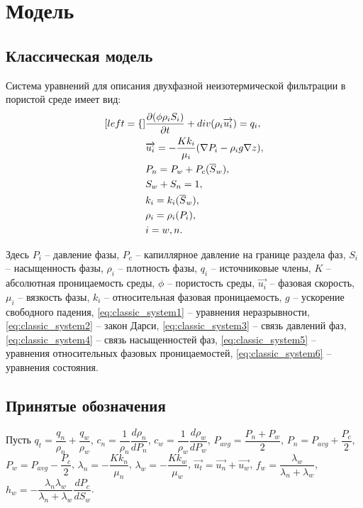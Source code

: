 \section{Модель}
\subsection{Классическая модель}
\label{classic_model}
Система уравнений для описания двухфазной неизотермической фильтрации в пористой среде
имеет вид:
\begin{subequations} \label{eq:classic_system}
  \begin{align}[left = \empheqlbrace\,]
    &\frac{\partial (\phi \rho_i S_i)}{\partial t} + div(\rho_i \overrightarrow{u_i}) = q_i, \label{eq:classic_system1} \\
    &\overrightarrow{u_i} = -\frac{K k_i}{\mu_i}(\nabla P_i - {\rho}_i g \nabla z), \label{eq:classic_system2} \\
    &P_n = P_w + P_{c}(\overline{S}_w), \label{eq:classic_system3} \\
    &S_w + S_n = 1, \label{eq:classic_system4} \\
    &k_i = k_i(\overline{S}_w), \label{eq:classic_system5} \\
    &\rho_i = \rho_i(P_i), \label{eq:classic_system6} \\
    &i = w,n \nonumber .
  \end{align}
\end{subequations}

Здесь 
$P_i$ -- давление фазы,
$P_c$ -- капиллярное давление на границе раздела фаз,
$S_i$ -- насыщенность фазы,
${\rho}_i$ -- плотность фазы,
$q_i$ -- источниковые члены,
$K$ -- абсолютная проницаемость среды,
$\phi$ -- пористость среды,
$\overrightarrow{u_i}$ -- фазовая скорость,
$\mu_i$ -- вязкость фазы,
$k_i$ -- относительная фазовая проницаемость,
$g$ -- ускорение свободного падения,
\eqref{eq:classic_system1} -- уравнения неразрывности,
\eqref{eq:classic_system2} -- закон Дарси,
\eqref{eq:classic_system3} -- связь давлений фаз,
\eqref{eq:classic_system4} -- связь насыщенностей фаз,
\eqref{eq:classic_system5} -- уравнения относительных фазовых проницаемостей,
\eqref{eq:classic_system6} -- уравнения состояния.

\subsection{Принятые обозначения}
\label{syms}
Пусть $q_t = \dfrac{q_n}{\rho_n} + \dfrac{q_w}{\rho_w}$,
$c_n = \dfrac{1}{\rho_n} \dfrac{d\rho_n}{dP_n}$,
$c_w = \dfrac{1}{\rho_w} \dfrac{d\rho_w}{dP_w}$,
$P_{avg} = \dfrac{P_n + P_w}{2}$,
$P_n = P_{avg} + \dfrac{P_c}{2}$,
$P_w = P_{avg} - \dfrac{P_c}{2}$,
$\lambda_n = -\dfrac{K k_n}{\mu_n}$,
$\lambda_w = -\dfrac{K k_w}{\mu_w}$,
$\overrightarrow{u_t} = \overrightarrow{u_n} + \overrightarrow{u_w}$,
$f_w = \dfrac{\lambda_w}{\lambda_n + \lambda_w}$,
$h_w = - \dfrac{\lambda_n\lambda_w}{\lambda_n + \lambda_w} \dfrac{dP_c}{dS_w}$.


